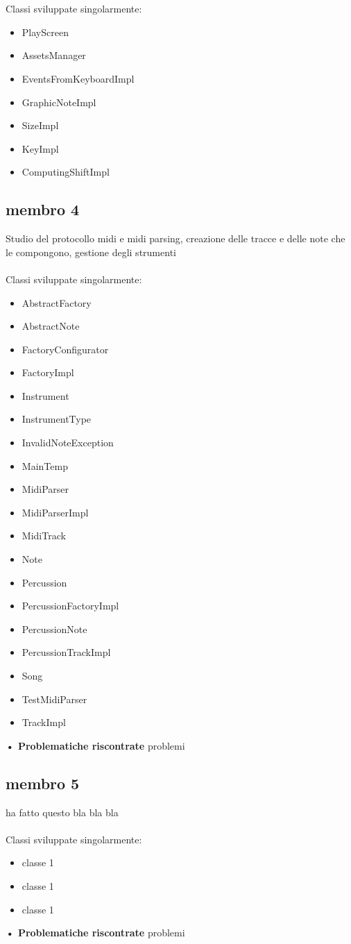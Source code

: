 \documentclass[a4paper,12pt]{report}
\begin{document}
\\ \\
Classi sviluppate singolarmente:
{
	\begin{itemize}
		\item PlayScreen
		\item AssetsManager
		\item EventsFromKeyboardImpl
		\item GraphicNoteImpl
		\item SizeImpl
		\item KeyImpl
		\item ComputingShiftImpl
	\end{itemize}
}
\hfill\break

\subsection{membro 4}
Studio del protocollo midi e midi parsing, creazione delle tracce e delle note che le compongono, gestione degli strumenti  \\ \\
Classi sviluppate singolarmente:
{
	\begin{itemize}
		\item AbstractFactory
		\item AbstractNote
		\item FactoryConfigurator
		\item FactoryImpl
		\item Instrument
		\item InstrumentType
		\item InvalidNoteException
		\item MainTemp
		\item MidiParser
		\item MidiParserImpl
		\item MidiTrack
		\item Note
		\item Percussion
		\item PercussionFactoryImpl
		\item PercussionNote
		\item PercussionTrackImpl
		\item Song
		\item TestMidiParser
		\item TrackImpl
	\end{itemize}
}
\hfill\break
\textbf{• Problematiche riscontrate}\hfill\break
problemi 
\newpage

\subsection{membro 5}
ha fatto questo bla bla bla \\ \\
Classi sviluppate singolarmente:
{
	\begin{itemize}
		\item classe 1
		\item classe 1
		\item classe 1
	\end{itemize}
}
\hfill\break
\textbf{• Problematiche riscontrate}\hfill\break
problemi 
\newpage
\end{document}
